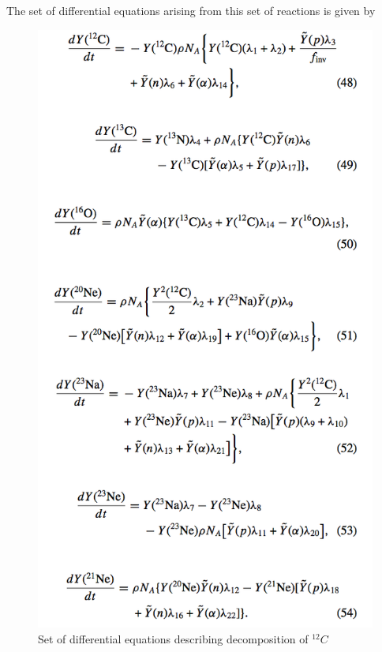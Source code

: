 \documentclass[11pt]{article}
\begin{document}
	The set of differential equations arising from this set of reactions is given by
	\begin{figure}[H]
		\centering
		\includegraphics{resources/differential}
		\caption{Set of differential equations describing decomposition of $^{12}C$}
	\end{figure}	
\end{document}
